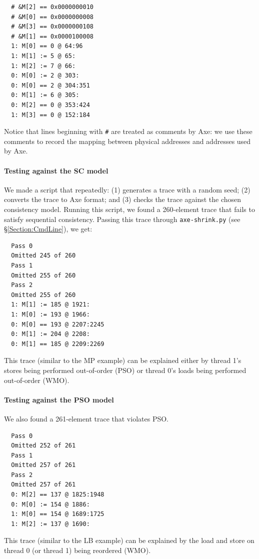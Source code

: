 \documentclass[11pt]{article}
\begin{document}
\begin{verbatim}
  # &M[2] == 0x0000000010
  # &M[0] == 0x0000000008
  # &M[3] == 0x0000000108
  # &M[1] == 0x0000100008
  1: M[0] == 0 @ 64:96
  1: M[1] := 5 @ 65:
  1: M[2] := 7 @ 66:
  0: M[0] := 2 @ 303:
  0: M[0] == 2 @ 304:351
  0: M[1] := 6 @ 305:
  0: M[2] == 0 @ 353:424
  1: M[3] == 0 @ 152:184
\end{verbatim}

\noindent Notice that lines beginning with \verb!#! are treated as
comments by Axe: we use these comments to record the mapping between
physical addresses and addresses used by Axe.

\paragraph{Testing against the SC model} We made a script
that repeatedly: (1) generates a trace with a random seed; (2)
converts the trace to Axe format; and (3) checks the trace against the
chosen consistency model.  Running this script, we found a 260-element
trace that fails to satisfy sequential consistency.  Passing this
trace through \verb!axe-shrink.py!  (see \S\ref{Section:CmdLine}), we
get:

\begin{verbatim}
  Pass 0
  Omitted 245 of 260         
  Pass 1
  Omitted 255 of 260         
  Pass 2
  Omitted 255 of 260         
  1: M[1] := 185 @ 1921:
  1: M[0] := 193 @ 1966:
  0: M[0] == 193 @ 2207:2245
  0: M[1] := 204 @ 2208:
  0: M[1] == 185 @ 2209:2269
\end{verbatim}

\noindent This trace (similar to the MP example) can be explained
either by thread 1's stores being performed out-of-order (PSO) or
thread 0's loads being performed out-of-order (WMO).

\paragraph{Testing against the PSO model}  We also found a
261-element trace that violates PSO. 

\begin{verbatim}
  Pass 0
  Omitted 252 of 261         
  Pass 1
  Omitted 257 of 261         
  Pass 2
  Omitted 257 of 261         
  0: M[2] == 137 @ 1825:1948
  0: M[0] := 154 @ 1886:
  1: M[0] == 154 @ 1689:1725
  1: M[2] := 137 @ 1690:
\end{verbatim}

\noindent This trace (similar to the LB example) can be explained by
the load and store on thread 0 (or thread 1) being reordered (WMO).
\end{document}
